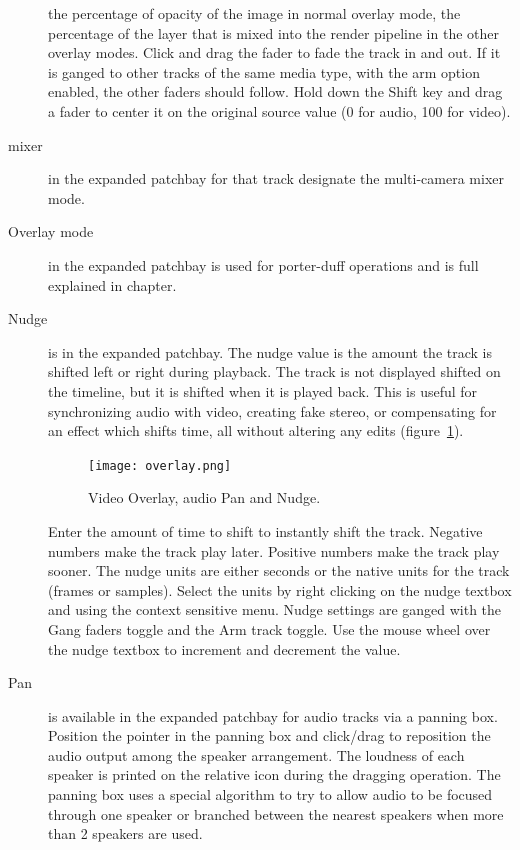\begin{description}
  the percentage of opacity of the image in normal overlay mode, the
  percentage of the layer that is mixed into the render pipeline in
  the other overlay modes.  Click and drag the fader to fade the track
  in and out.  If it is ganged to other tracks of the same media type,
  with the arm option enabled, the other faders should follow.  Hold
  down the Shift key and drag a fader to center it on the original
  source value (0 for audio, 100 for video).
\item[mixer] in the expanded patchbay for that track designate
  the multi-camera mixer mode.
\item[Overlay mode] in the expanded patchbay is used for
  porter-duff operations and is full explained in
   chapter.
\item[Nudge] is in the expanded patchbay.  The nudge value is
  the amount the track is shifted left or right during playback. The
  track is not displayed shifted on the timeline, but it is shifted
  when it is played back. This is useful for synchronizing audio with
  video, creating fake stereo, or compensating for an effect which
  shifts time, all without altering any edits
  (figure~\ref{fig:overlay}).

  \begin{figure}[htpb] \centering
    \texttt{[image: overlay.png]}
    \caption{Video Overlay, audio Pan and Nudge.}
    \label{fig:overlay}
  \end{figure}

  Enter the amount of time to shift to instantly shift the
  track. Negative numbers make the track play later. Positive numbers
  make the track play sooner. The nudge units are either seconds or
  the native units for the track (frames or samples). Select the units
  by right clicking on the nudge textbox and using the context
  sensitive menu. Nudge settings are ganged with the Gang faders
  toggle and the Arm track toggle. Use the mouse wheel over the nudge
  textbox to increment and decrement the value.
\item[Pan] is available in the expanded patchbay for audio
  tracks via a panning box. Position the pointer in the panning box
  and click/drag to reposition the audio output among the speaker
  arrangement. The loudness of each speaker is printed on the relative
  icon during the dragging operation. The panning box uses a special
  algorithm to try to allow audio to be focused through one speaker or
  branched between the nearest speakers when more than 2 speakers are
  used.
\end{description}

